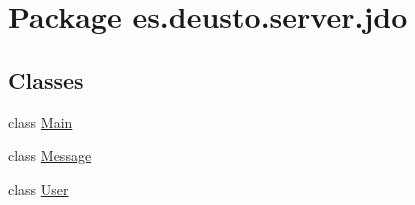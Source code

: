 \hypertarget{namespacees_1_1deusto_1_1server_1_1jdo}{}\section{Package es.\+deusto.\+server.\+jdo}
\label{namespacees_1_1deusto_1_1server_1_1jdo}
\subsection*{Classes}
\begin{DoxyCompactItemize}
\item 
class \mbox{\hyperlink{classes_1_1deusto_1_1server_1_1jdo_1_1_main}{Main}}
\item 
class \mbox{\hyperlink{classes_1_1deusto_1_1server_1_1jdo_1_1_message}{Message}}
\item 
class \mbox{\hyperlink{classes_1_1deusto_1_1server_1_1jdo_1_1_user}{User}}
\end{DoxyCompactItemize}
